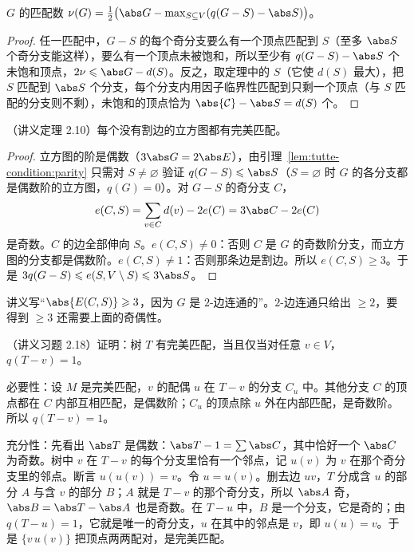 \begin{corollary}\label{cor:tutte-condition:berge}
$G$ 的匹配数 $\nu(G)=\frac12\bigl(\abs G-\max_{S\subseteq V}(q(G-S)-\abs S)\bigr)$。
\end{corollary}
\begin{proof}
任一匹配中，$G-S$ 的每个奇分支要么有一个顶点匹配到 $S$（至多 $\abs S$ 个奇分支能这样），要么有一个顶点未被饱和，所以至少有 $q(G-S)-\abs S$ 个未饱和顶点，$2\nu\leqslant\abs G-d(S)$。反之，取定理中的 $S$（它使 $d(S)$ 最大），把 $S$ 匹配到 $\abs S$ 个分支，每个分支内用因子临界性匹配到只剩一个顶点（与 $S$ 匹配的分支则不剩），未饱和的顶点恰为 $\abs{\mathcal C}-\abs S=d(S)$ 个。
\end{proof}

\begin{theorem}[Petersen]\label{thm:tutte-condition:petersen}
（讲义定理 2.10）每个没有割边的立方图都有完美匹配。
\end{theorem}
\begin{proof}
立方图的阶是偶数（$3\abs G=2\abs E$），由引理~\ref{lem:tutte-condition:parity} 只需对 $S\neq\varnothing$ 验证 $q(G-S)\leqslant\abs S$（$S=\varnothing$ 时 $G$ 的各分支都是偶数阶的立方图，$q(G)=0$）。对 $G-S$ 的奇分支 $C$，
\[
e(C,S)=\sum_{v\in C}d(v)-2e(C)=3\abs C-2e(C)
\]
是奇数。$C$ 的边全部伸向 $S$。$e(C,S)\neq0$：否则 $C$ 是 $G$ 的奇数阶分支，而立方图的分支都是偶数阶。$e(C,S)\neq1$：否则那条边是割边。所以 $e(C,S)\geqslant3$。于是 $3q(G-S)\leqslant e(S,V\setminus S)\leqslant3\abs S$。
\end{proof}

\begin{remark}
讲义写“$\abs{E(C,S)}\geqslant3$，因为 $G$ 是 $2$-边连通的”。$2$-边连通只给出 $\geqslant2$，要得到 $\geqslant3$ 还需要上面的奇偶性。
\end{remark}

\begin{workedexample}\label{we:tutte-condition:tree}
（讲义习题 2.18）证明：树 $T$ 有完美匹配，当且仅当对任意 $v\in V$，$q(T-v)=1$。
\end{workedexample}
\begin{solution}
必要性：设 $M$ 是完美匹配，$v$ 的配偶 $u$ 在 $T-v$ 的分支 $C_u$ 中。其他分支 $C$ 的顶点都在 $C$ 内部互相匹配，是偶数阶；$C_u$ 的顶点除 $u$ 外在内部匹配，是奇数阶。所以 $q(T-v)=1$。

充分性：先看出 $\abs T$ 是偶数：$\abs T-1=\sum\abs C$，其中恰好一个 $\abs C$ 为奇数。树中 $v$ 在 $T-v$ 的每个分支里恰有一个邻点，记 $u(v)$ 为 $v$ 在那个奇分支里的邻点。断言 $u(u(v))=v$。令 $u=u(v)$。删去边 $uv$，$T$ 分成含 $u$ 的部分 $A$ 与含 $v$ 的部分 $B$；$A$ 就是 $T-v$ 的那个奇分支，所以 $\abs A$ 奇，$\abs B=\abs T-\abs A$ 也是奇数。在 $T-u$ 中，$B$ 是一个分支，它是奇的；由 $q(T-u)=1$，它就是唯一的奇分支，$u$ 在其中的邻点是 $v$，即 $u(u)=v$。于是 $\{v\,u(v)\}$ 把顶点两两配对，是完美匹配。
\end{solution}

